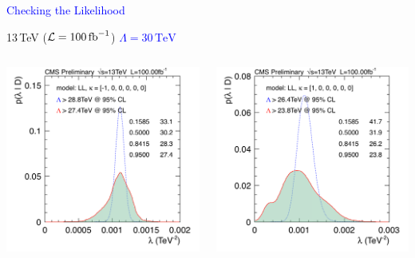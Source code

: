 \documentclass[t,professionalfonts,handout, xcolor=pdftex,dvipsnames,table]{beamer}
\begin{document}
\begin{frame}
\textcolor{blue}{Checking the Likelihood} 

13\,TeV (${\cal L} = 100\,\textrm{fb}^{-1}$) \textcolor{blue}{$\Lambda = 30\,\textrm{TeV}$}

\medskip

\begin{columns}[T]

\begin{column}{0.49\textwidth}
\centerline{\includegraphics[width=\textwidth]{limit_LL_c_100.png}}
\end{column}

\begin{column}{0.49\textwidth}
\includegraphics[width=\textwidth]{limit_LL_d_100.png}
\end{column}

\end{columns}

\end{frame}
\end{document}
